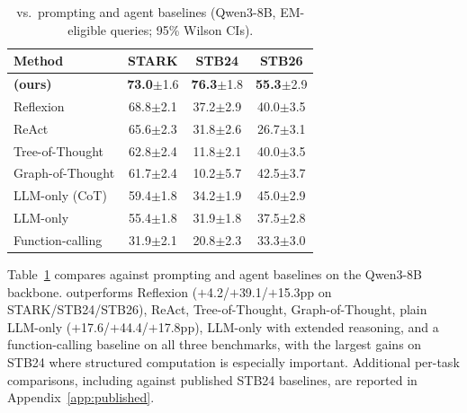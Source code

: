 \setlength{\intextsep}{2pt}\setlength{\columnsep}{8pt}
\begin{table}
\centering
\caption{\starname{} vs.\ prompting and agent baselines (Qwen3-8B, EM-eligible queries; 95\% Wilson CIs).}
\label{tab:baselines}
\scriptsize
\setlength{\tabcolsep}{3pt}
\begin{tabular}{lccc}
\toprule
Method & STARK & STB24 & STB26 \\
\midrule
\textbf{\starname{} (ours)}    & \textbf{73.0}\tiny{$\pm$1.6} & \textbf{76.3}\tiny{$\pm$1.8} & \textbf{55.3}\tiny{$\pm$2.9} \\
Reflexion                      & 68.8\tiny{$\pm$2.1} & 37.2\tiny{$\pm$2.9} & 40.0\tiny{$\pm$3.5} \\
ReAct                          & 65.6\tiny{$\pm$2.3} & 31.8\tiny{$\pm$2.6} & 26.7\tiny{$\pm$3.1} \\
Tree-of-Thought                & 62.8\tiny{$\pm$2.4} & 11.8\tiny{$\pm$2.1} & 40.0\tiny{$\pm$3.5} \\
Graph-of-Thought               & 61.7\tiny{$\pm$2.4} & 10.2\tiny{$\pm$5.7} & 42.5\tiny{$\pm$3.7} \\
LLM-only (CoT)                 & 59.4\tiny{$\pm$1.8} & 34.2\tiny{$\pm$1.9} & 45.0\tiny{$\pm$2.9} \\
LLM-only                       & 55.4\tiny{$\pm$1.8} & 31.9\tiny{$\pm$1.8} & 37.5\tiny{$\pm$2.8} \\
Function-calling               & 31.9\tiny{$\pm$2.1} & 20.8\tiny{$\pm$2.3} & 33.3\tiny{$\pm$3.0} \\
\bottomrule
\end{tabular}
\end{table}
Table~\ref{tab:baselines} compares \starname{} against prompting and agent baselines on the Qwen3-8B backbone.
\starname{} outperforms Reflexion ($+$4.2/$+$39.1/$+$15.3pp on STARK/STB24/STB26), ReAct, Tree-of-Thought, Graph-of-Thought, plain LLM-only ($+$17.6/$+$44.4/$+$17.8pp), LLM-only with extended reasoning, and a function-calling baseline on all three benchmarks, with the largest gains on STB24 where structured computation is especially important.
Additional per-task comparisons, including against published STB24 baselines, are reported in Appendix~\ref{app:published}.

